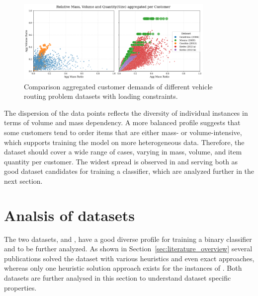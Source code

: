 \begin{figure}[ht]
	\centering
	\includegraphics[width=0.85\textwidth]{pictures/comparison_datasets_3lcvrp.png}
	\caption{Comparison aggregated customer demands of different vehicle routing problem datasets with loading constraints.}
	\label{fig:dataset_comparison}
\end{figure}

The dispersion of the data points reflects the diversity of individual instances in terms of volume
and mass dependency. A more balanced profile suggests that some customers tend to order items that
are either mass- or volume-intensive, which supports training the model on more heterogeneous data.
Therefore, the dataset should cover a wide range of cases, varying in mass, volume, and item
quantity per customer. The widest spread is observed in \krebsADataSetText and \gendreauDataSetText serving
both as good dataset candidates for training a classifier, which are analyzed further in
the next section.

\section{Analsis of datasets}
\label{sec:analysis_datasets}

The two datasets, \krebsADataSetText and \gendreauDataSet, have a good diverse profile for training
a binary classifier and to be further analyzed.
As shown in Section~\ref{sec:literature_overview} several publications solved the \gendreauDataSetText dataset
with various heuristics and even exact approaches, whereas only one heuristic solution approach exists for the instances of \krebsADataSet.
Both datasets are further analysed in this section to understand dataset specific properties.

\subsubsection{\krebsADataSetText}

